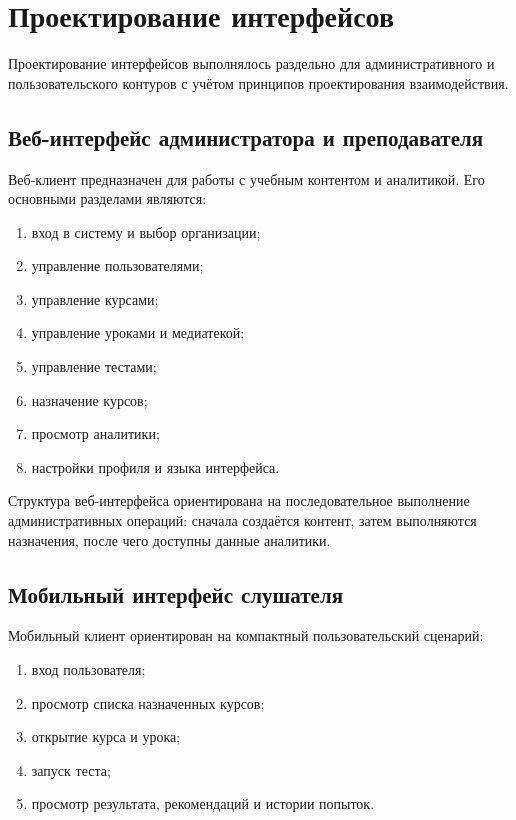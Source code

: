 \section{Проектирование интерфейсов}

Проектирование интерфейсов выполнялось раздельно для административного и пользовательского контуров с учётом принципов проектирования взаимодействия\cite{cooper2008aboutface,norman2013design,krug2014dontmake}.

\subsection{Веб-интерфейс администратора и преподавателя}

Веб-клиент предназначен для работы с учебным контентом и аналитикой. Его основными разделами являются:
\begin{enumerate}
  \item вход в систему и выбор организации;
  \item управление пользователями;
  \item управление курсами;
  \item управление уроками и медиатекой;
  \item управление тестами;
  \item назначение курсов;
  \item просмотр аналитики;
  \item настройки профиля и языка интерфейса.
\end{enumerate}

Структура веб-интерфейса ориентирована на последовательное выполнение административных операций: сначала создаётся контент, затем выполняются назначения, после чего доступны данные аналитики.

\subsection{Мобильный интерфейс слушателя}

Мобильный клиент ориентирован на компактный пользовательский сценарий:
\begin{enumerate}
  \item вход пользователя;
  \item просмотр списка назначенных курсов;
  \item открытие курса и урока;
  \item запуск теста;
  \item просмотр результата, рекомендаций и истории попыток.
\end{enumerate}

